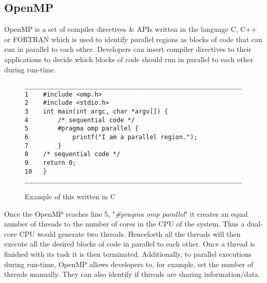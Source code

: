 \documentclass[a4paper,11pt]{article}
\begin{document}
\subsection{OpenMP}
OpenMP is a set of compiler directives \& APIs written in the language C, C++ or FORTRAN which is used to identify parallel regions as blocks of code that can run in parallel to each other. Developers can insert compiler directives to their applications to decide which blocks of code should run in parallel to each other during run-time.\cite{Operatingsystemconcepts}
\begin{figure}[h]
    \centering
    \caption{Example of this written in C}
    \label{fig:block_of_code_2}
    \begin{verbatim}
_________________________________________________________________
1    #include <omp.h>
2    #include <stdio.h>
3    int main(int argc, char *argv[]) {
4        /* sequential code */
5        #pragma omp parallel {
6            printf("I am a parallel region.");
7        }
8    /* sequential code */
9    return 0;
10   }
_________________________________________________________________
    \end{verbatim}
\end{figure}
\newline\noindent Once the OpenMP reaches line 5, "\emph{\#pragma omp parallel}" it creates an equal number of threads to the number of cores in the CPU of the system. Thus a dual-core CPU would generate two threads. Henceforth all the threads will then execute all the desired blocks of code in parallel to each other. Once a thread is finished with its task it is then terminated.
\newline\indent Additionally, to parallel executions during run-time, OpenMP allows developers to, for example, set the number of threads manually. They can also identify if threads are sharing information/data.\cite{Operatingsystemconcepts}
\end{document}
